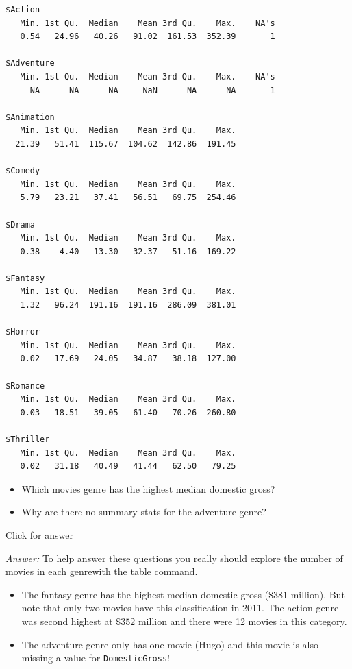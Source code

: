 \documentclass[
]{book}
\providecommand{\tightlist}{%
  \setlength{\itemsep}{0pt}\setlength{\parskip}{0pt}}
\begin{document}
\begin{verbatim}
$Action
   Min. 1st Qu.  Median    Mean 3rd Qu.    Max.    NA's 
   0.54   24.96   40.26   91.02  161.53  352.39       1 

$Adventure
   Min. 1st Qu.  Median    Mean 3rd Qu.    Max.    NA's 
     NA      NA      NA     NaN      NA      NA       1 

$Animation
   Min. 1st Qu.  Median    Mean 3rd Qu.    Max. 
  21.39   51.41  115.67  104.62  142.86  191.45 

$Comedy
   Min. 1st Qu.  Median    Mean 3rd Qu.    Max. 
   5.79   23.21   37.41   56.51   69.75  254.46 

$Drama
   Min. 1st Qu.  Median    Mean 3rd Qu.    Max. 
   0.38    4.40   13.30   32.37   51.16  169.22 

$Fantasy
   Min. 1st Qu.  Median    Mean 3rd Qu.    Max. 
   1.32   96.24  191.16  191.16  286.09  381.01 

$Horror
   Min. 1st Qu.  Median    Mean 3rd Qu.    Max. 
   0.02   17.69   24.05   34.87   38.18  127.00 

$Romance
   Min. 1st Qu.  Median    Mean 3rd Qu.    Max. 
   0.03   18.51   39.05   61.40   70.26  260.80 

$Thriller
   Min. 1st Qu.  Median    Mean 3rd Qu.    Max. 
   0.02   31.18   40.49   41.44   62.50   79.25 
\end{verbatim}

\begin{itemize}
\tightlist
\item
  Which movies genre has the highest median domestic gross?
\item
  Why are there no summary stats for the adventure genre?
\end{itemize}

Click for answer

\emph{Answer:} To help answer these questions you really should explore the number of movies in each genrewith the table command.

\begin{itemize}
\item
  The fantasy genre has the highest median domestic gross (\(\$381\) million). But note that only two movies have this classification in 2011. The action genre was second highest at \(\$352\) million and there were 12 movies in this category.
\item
  The adventure genre only has one movie (Hugo) and this movie is also missing a value for \texttt{DomesticGross}!
\end{itemize}
\end{document}
